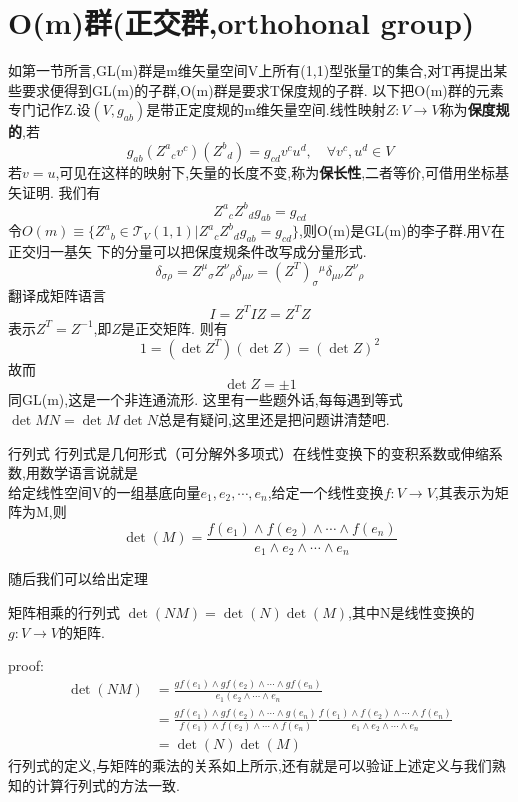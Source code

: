 \documentclass[../main.tex]{subfiles}
\begin{document}
 \section{O(m)群(正交群,orthohonal group)}
 如第一节所言,GL(m)群是m维矢量空间V上所有(1,1)型张量T的集合,对T再提出某些要求便得到GL(m)的子群,O(m)群是要求T保度规的子群.
 以下把O(m)群的元素专门记作Z.设$(V,g_{ab})$是带正定度规的m维矢量空间.线性映射$Z:V \rightarrow V$称为\textbf{保度规的},若
 $$g_{ab}(Z^a{}_cv^c)(Z^b{}_d) = g_{cd}v^cu^d,\quad \forall v^c,u^d \in V$$
 若$v=u$,可见在这样的映射下,矢量的长度不变,称为\textbf{保长性},二者等价,可借用坐标基矢证明.
 我们有\begin{equation*}
     Z^a{}_cZ^b{}_d g_{ab}=g_{cd}
 \end{equation*}
 令$O(m)\equiv \{Z^a{}_b\in\mathscr{T}_V(1,1)|Z^a{}_cZ^b{}_d g_{ab}=g_{cd}\}$,则O(m)是GL(m)的李子群.用V在正交归一基矢
 下的分量可以把保度规条件改写成分量形式.
 $$\delta_{\sigma \rho} = Z^{\mu}{}_{\sigma}Z^{\nu}{}_{\rho}\delta_{\mu \nu} = (Z^T)_{\sigma}{}^{\mu}\delta_{\mu\nu}Z^{\nu}{}_{\rho}$$
 翻译成矩阵语言 $$ I = Z^{T}IZ = Z^TZ$$
 表示$Z^T= Z^{-1}$,即$Z$是正交矩阵.
 则有$$1=(\det Z^T)(\det Z) = (\det Z)^2$$
 故而$$\det Z = \pm 1$$同GL(m),这是一个非连通流形.
 这里有一些题外话,每每遇到等式$\det{MN} = \det{M}\det{N}$总是有疑问,这里还是把问题讲清楚吧.
 \begin{definition}{}{行列式}
     行列式是几何形式（可分解外多项式）在线性变换下的变积系数或伸缩系数,用数学语言说就是\\
     给定线性空间V的一组基底向量$e_1,e_2,\cdots,e_n$,给定一个线性变换$f:V\rightarrow V$,其表示为矩阵为M,则
     $$\det(M) = \frac{f(e_1)\wedge f(e_2) \wedge \cdots \wedge f(e_n)}{e_1 \wedge e_2\wedge \cdots \wedge e_n}$$
 \end{definition}
 随后我们可以给出定理
 \begin{theorem}{}{矩阵相乘的行列式}
     $\det(NM) = \det(N)\det(M)$,其中N是线性变换的$g:V\rightarrow V$的矩阵.
 \end{theorem}
 proof:\begin{align*}
 \det(N M)&=\frac{g f\left(e_{1}\right) \wedge g f\left(e_{2}\right) \wedge \cdots \wedge g f\left(e_{n}\right)}{e_{1}\left(e_{2} \wedge \cdots \wedge e_{n}\right.} \\
 &=\frac{g f\left(e_{1}\right) \wedge g f\left(e_{2}\right) \wedge \cdots  \wedge g\left(e_{n}\right)}{f\left(e_{1}\right) \wedge f\left(e_{2}\right) \wedge \cdots \wedge f\left(e_{n}\right)} \frac{f\left(e_{1}\right) \wedge f\left(e_{2}\right) \wedge \cdots \wedge f\left(e_{n}\right)}{e_{1} \wedge e_{2} \wedge \cdots \wedge e_{n}} \\
 &=\det(N) \det(M)
 \end{align*}
 行列式的定义,与矩阵的乘法的关系如上所示,还有就是可以验证上述定义与我们熟知的计算行列式的方法一致.
\end{document}
